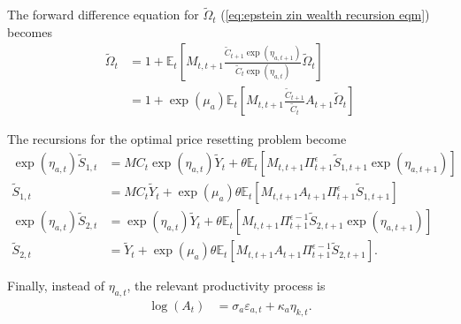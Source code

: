\documentclass[12 pt, oneside]{article}
\theoremstyle{definition}
\theoremstyle{definition}
\theoremstyle{definition}
\newcommand{\E}{\mathbb{E}}
\begin{document}
The forward difference equation for $\tilde{\Omega}_t$ (\ref{eq:epstein zin wealth recursion eqm}) becomes
\begin{align*}
  \tilde{\Omega}_t & = 1 + \E_t \left[M_{t, t + 1}\frac{\tilde{C}_{t + 1}\exp(\eta_{a, t + 1})}{\tilde{C}_t\exp(\eta_{a, t})}\tilde{\Omega}_t\right]\\
                  & = 1 + \exp(\mu_a)\E_t \left[M_{t, t + 1}\frac{\tilde{C}_{t + 1}}{\tilde{C}_t}A_{t + 1}\tilde{\Omega}_t\right]
\end{align*}

The recursions for the optimal price resetting problem become
\begin{align*}
  \exp(\eta_{a, t})\tilde{S}_{1, t} & = MC_t\exp(\eta_{a, t})\tilde{Y}_t + \theta\E_t[M_{t, t + 1}\Pi_{t + 1}^\epsilon \tilde{S}_{1, t + 1}\exp(\eta_{a, t + 1})]\\
  \tilde{S}_{1, t} & = MC_t \tilde{Y}_t + \exp(\mu_a)\theta\E_t[M_{t, t + 1}A_{t + 1}\Pi_{t + 1}^\epsilon \tilde{S}_{1, t + 1}]\\
  \exp(\eta_{a, t})\tilde{S}_{2, t} & = \exp(\eta_{a, t})\tilde{Y}_t + \theta\E_t[M_{t, t + 1}\Pi_{t + 1}^{\epsilon - 1} \tilde{S}_{2, t + 1}\exp(\eta_{a, t + 1})]\\
\tilde{S}_{2, t} & = \tilde{Y}_t + \exp(\mu_a)\theta\E_t[M_{t, t + 1}A_{t + 1}\Pi_{t + 1}^{\epsilon - 1} \tilde{S}_{2, t + 1}].
\end{align*}

Finally, instead of $\eta_{a, t}$, the relevant productivity process is
\begin{align*}
  \log(A_t) & = \sigma_a\varepsilon_{a, t} + \kappa_a \eta_{k, t}.
\end{align*}
\end{document}
